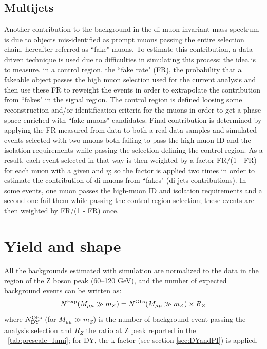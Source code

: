 \subsection{Multijets}
Another contribution to the background in the di-muon invariant mass spectrum is due to objects mis-identified as prompt muons passing the entire selection chain, hereafter referred as ``fake" muons.
To estimate this contribution, a data-driven technique is used due to difficulties in simulating this process: the idea is to measure, in a control region, the ``fake rate" (FR), the probability that a fakeable object passes the high \pt muon selection used for the current analysis and then use these FR to reweight the events in order to extrapolate the contribution from ``fakes" in the signal region. The control region is defined loosing some reconstruction and/or identification criteria for the muons in order to get a phase space enriched with ``fake muons" candidates. Final contribution is determined by applying the FR measured from data to both a real data samples and simulated events selected with two muons both failing to pass the high \pt muon ID and the isolation requirements while passing the selection defining the control region. As a result, each event selected in that way is then weighted by a factor FR/(1 - FR) for each muon with a given \pt and $\eta$; so the factor is applied two times in order to estimate the
contribution of di-muons from ``fakes" (di-jets contributions). In some events, one muon passes the high-\pt muon ID and isolation requirements and a second one fail them while passing the control region selection; these events are then weighted by FR/(1 - FR) once.

\section{Yield and shape}
All the backgrounds estimated with simulation are normalized to the data in the region of the Z boson peak (60--120 GeV), and the number of expected background
events can be written as:
\begin{equation}
N^{\rm Exp} (M_{\mu\mu}\gg m_Z) = {N^{\rm Obs} (M_{\mu\mu}\gg m_Z)} \times R_Z
\label{DYexpected}
\end{equation}
where $N^{\rm Obs}_{\rm DY}$ (for $M_{\mu\mu} \gg m_Z$) is the number of background event passing the analysis selection and $R_Z$ the ratio at Z peak reported in the \tablename~\ref{tab:prescale_lumi}; for DY, the k-factor (see section \ref{sec:DYandPI}) is applied.

